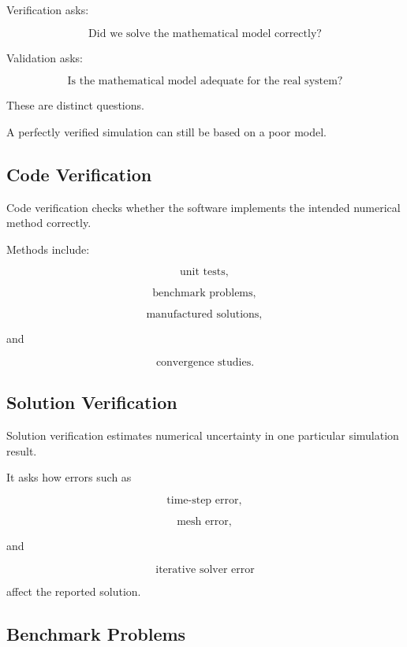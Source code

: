 Verification asks:

\[
\boxed{
\text{Did we solve the mathematical model correctly?}
}
\]

Validation asks:

\[
\boxed{
\text{Is the mathematical model adequate for the real system?}
}
\]

These are distinct questions.

A perfectly verified simulation can still be based on a poor model.

\subsection{Code Verification}
\label{subsec:simulation-code-verification}

Code verification checks whether the software implements the intended
numerical method correctly.

Methods include:

\[
\boxed{
\text{unit tests},
}
\]

\[
\boxed{
\text{benchmark problems},
}
\]

\[
\boxed{
\text{manufactured solutions},
}
\]

and

\[
\boxed{
\text{convergence studies}.
}
\]

\subsection{Solution Verification}
\label{subsec:simulation-solution-verification}

Solution verification estimates numerical uncertainty in one particular
simulation result.

It asks how errors such as

\[
\boxed{
\text{time-step error},
}
\]

\[
\boxed{
\text{mesh error},
}
\]

and

\[
\boxed{
\text{iterative solver error}
}
\]

affect the reported solution.

\subsection{Benchmark Problems}
\label{subsec:simulation-benchmark-problems}

